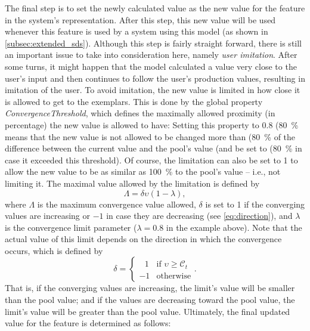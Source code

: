 The final step is to set the newly calculated value as the new value for the feature in the system's representation.
After this step, this new value will be used whenever this feature is used by a system using this model (as shown in \cref{subsec:extended_sds}).
Although this step is fairly straight forward, there is still an important issue to take into consideration here, namely \emph{user imitation}.
After some turns, it might happen that the model calculated a value very close to the user's input and then continues to follow the user's production values, resulting in imitation of the user.
To avoid imitation, the new value is limited in how close it is allowed to get to the exemplars.
This is done by the global property \emph{ConvergenceThreshold}, which defines the maximally allowed proximity (in percentage) the new value is allowed to have:
Setting this property to 0.8 (\SI{80}{\percent} means that the new value is not allowed to be changed more than (\SI{80}{\percent} of the difference between the current value and the pool's value (and be set to (\SI{80}{\percent} in case it exceeded this threshold).
Of course, the limitation can also be set to 1 to allow the new value to be as similar as \SI{100}{\percent} to the pool's value -- i.e., not limiting it.
The maximal value allowed by the limitation is defined by
%
\begin{equation}
	\label{eq:conv_limit}
	\Lambda = \delta \upsilon \left(1 - \lambda \right),
\end{equation}
\noindent
%
where $\Lambda$ is the maximum convergence value allowed, $\delta$ is set to 1 if the converging values are increasing or $-1$ in case they are decreasing (see \cref{eq:direction}), and $\lambda$ is the convergence limit parameter ($\lambda=0.8$ in the example above).
\noindent
Note that the actual value of this limit depends on the direction in which the convergence occurs, which is defined by
%
\begin{equation}
	\label{eq:direction}
	\delta = 		
	\begin{cases}
		\ \ \ 1 & \text{if } \upsilon \geq \mathcal{C}_t\\
		-1 & \text{otherwise}
	\end{cases}.
\end{equation}
\noindent
%
That is, if the converging values are increasing, the limit's value will be smaller than the pool value;
and if the values are decreasing toward the pool value, the limit's value will be greater than the pool value.
Ultimately, the final updated value for the feature is determined as follows:
